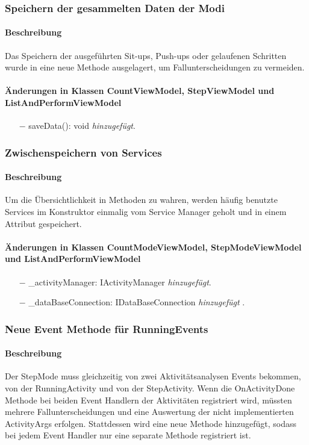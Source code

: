 \documentclass[a4paper,12pt]{article}
\begin{document}
\subsubsection{Speichern der gesammelten Daten der Modi}
\paragraph{Beschreibung}
Das Speichern der ausgeführten Sit-ups, Push-ups oder gelaufenen Schritten wurde in eine neue Methode ausgelagert, um Fallunterscheidungen zu vermeiden.
\paragraph{Änderungen in Klassen CountViewModel, StepViewModel und ListAndPerformViewModel} 
\begin{itemize}
	\item[$-$] saveData(): void \textit{hinzugefügt}.
\end{itemize}

\subsubsection{Zwischenspeichern von Services}
\paragraph{Beschreibung}
Um die Übersichtlichkeit in Methoden zu wahren, werden häufig benutzte Services im Konstruktor einmalig vom Service Manager geholt und in einem Attribut gespeichert.
\paragraph{Änderungen in Klassen CountModeViewModel, StepModeViewModel und ListAndPerformViewModel} 
\begin{itemize}
	\item[$-$] \_activityManager: IActivityManager \textit{hinzugefügt}.
	\item[$-$] \_dataBaseConnection: IDataBaseConnection \textit{hinzugefügt} .
\end{itemize}

\subsubsection{Neue Event Methode für RunningEvents}
\paragraph{Beschreibung}
Der StepMode muss gleichzeitig von zwei Aktivitätsanalysen Events bekommen, von der RunningActivity und von der StepActivity. Wenn die OnActivityDone Methode bei beiden Event Handlern der Aktivitäten registriert wird, müssten mehrere Fallunterscheidungen und eine Auswertung der nicht implementierten ActivityArgs erfolgen. Stattdessen wird eine neue Methode hinzugefügt, sodass bei jedem Event Handler nur eine separate Methode registriert ist.
\end{document}

